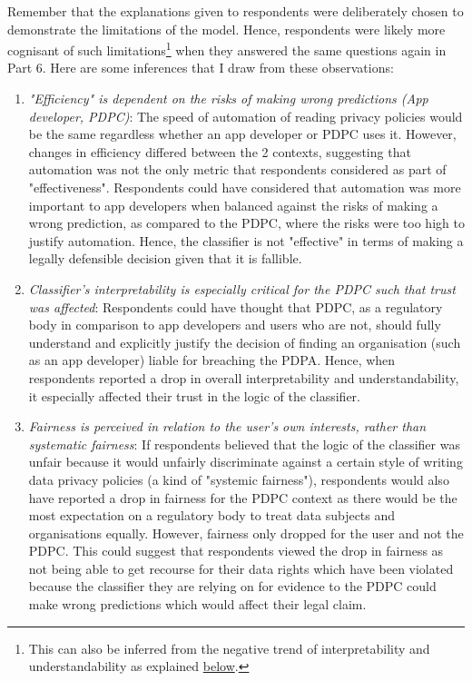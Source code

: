 Remember that the explanations given to respondents were deliberately chosen to demonstrate the limitations of the model. Hence, respondents were likely more cognisant of such limitations\footnote{This can also be inferred from the negative trend of interpretability and understandability as explained \hyperref[sec:interpret_understand]{below}.} when they answered the same questions again in Part 6. Here are some inferences that I draw from these observations:
\begin{enumerate}
    \item \textit{"Efficiency" is dependent on the risks of making wrong predictions (App developer, PDPC)}: The speed of automation of reading privacy policies would be the same regardless whether an app developer or PDPC uses it. However, changes in efficiency differed between the 2 contexts, suggesting that automation was not the only metric that respondents considered as part of "effectiveness". Respondents could have considered that automation was more important to app developers when balanced against the risks of making a wrong prediction, as compared to the PDPC, where the risks were too high to justify automation. Hence, the classifier is not "effective" in terms of making a legally defensible decision given that it is fallible.
    
    \item \textit{Classifier's interpretability is especially critical for the PDPC such that trust was affected}: Respondents could have thought that PDPC, as a regulatory body in comparison to app developers and users who are not, should fully understand and explicitly justify the decision of finding an organisation (such as an app developer) liable for breaching the PDPA. Hence, when respondents reported a drop in overall interpretability and understandability, it especially affected their trust in the logic of the classifier.
    
    \item \textit{Fairness is perceived in relation to the user's own interests, rather than systematic fairness}: If respondents believed that the logic of the classifier was unfair because it would unfairly discriminate against a certain style of writing data privacy policies (a kind of "systemic fairness"), respondents would also have reported a drop in fairness for the PDPC context as there would be the most expectation on a regulatory body to treat data subjects and organisations equally. However, fairness only dropped for the user and not the PDPC. This could suggest that respondents viewed the drop in fairness as not being able to get recourse for their data rights which have been violated because the classifier they are relying on for evidence to the PDPC could make wrong predictions which would affect their legal claim.
     

\end{enumerate}

